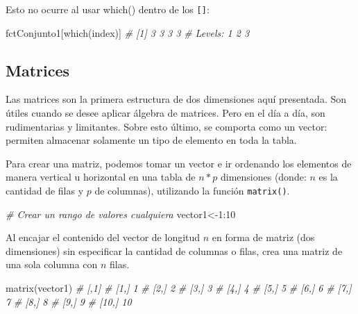 \documentclass[
]{article}
\newenvironment{Shaded}{\begin{snugshade}}{\end{snugshade}}
\newcommand{\CommentTok}[1]{\textcolor[rgb]{0.56,0.35,0.01}{\textit{#1}}}
\newcommand{\DecValTok}[1]{\textcolor[rgb]{0.00,0.00,0.81}{#1}}
\newcommand{\FunctionTok}[1]{\textcolor[rgb]{0.00,0.00,0.00}{#1}}
\newcommand{\NormalTok}[1]{#1}
\newcommand{\OtherTok}[1]{\textcolor[rgb]{0.56,0.35,0.01}{#1}}
\newcommand{\SpecialCharTok}[1]{\textcolor[rgb]{0.00,0.00,0.00}{#1}}
\theoremstyle{definition}
\theoremstyle{definition}
\theoremstyle{definition}
\theoremstyle{definition}
\theoremstyle{remark}
\begin{document}
Esto no ocurre al usar which() dentro de los \texttt{{[}{]}}:

\begin{Shaded}
\begin{Highlighting}[]
\NormalTok{fctConjunto1[}\FunctionTok{which}\NormalTok{(index)]}
\CommentTok{\# [1] 3 3 3 3}
\CommentTok{\# Levels: 1 2 3}
\end{Highlighting}
\end{Shaded}

\hypertarget{matrices}{%
\subsection{Matrices}\label{matrices}}

Las matrices son la primera estructura de dos dimensiones aquí presentada. Son útiles cuando se desee aplicar álgebra de matrices. Pero en el día a día, son rudimentarias y limitantes. Sobre esto último, se comporta como un vector: permiten almacenar solamente un tipo de elemento en toda la tabla.

Para crear una matriz, podemos tomar un vector e ir ordenando los elementos de manera vertical u horizontal en una tabla de \(n*p\) dimensiones (donde: \(n\) es la cantidad de filas y \(p\) de columnas), utilizando la función \texttt{matrix()}.

\begin{Shaded}
\begin{Highlighting}[]
\CommentTok{\# Crear un rango de valores cualquiera}
\NormalTok{vector1}\OtherTok{\textless{}{-}}\DecValTok{1}\SpecialCharTok{:}\DecValTok{10}
\end{Highlighting}
\end{Shaded}

Al encajar el contenido del vector de longitud \(n\) en forma de matriz (dos dimensiones) sin especificar la cantidad de columnas o filas, crea una matriz de una sola columna con \(n\) filas.

\begin{Shaded}
\begin{Highlighting}[]
\FunctionTok{matrix}\NormalTok{(vector1)}
\CommentTok{\#       [,1]}
\CommentTok{\#  [1,]    1}
\CommentTok{\#  [2,]    2}
\CommentTok{\#  [3,]    3}
\CommentTok{\#  [4,]    4}
\CommentTok{\#  [5,]    5}
\CommentTok{\#  [6,]    6}
\CommentTok{\#  [7,]    7}
\CommentTok{\#  [8,]    8}
\CommentTok{\#  [9,]    9}
\CommentTok{\# [10,]   10}
\end{Highlighting}
\end{Shaded}
\end{document}
